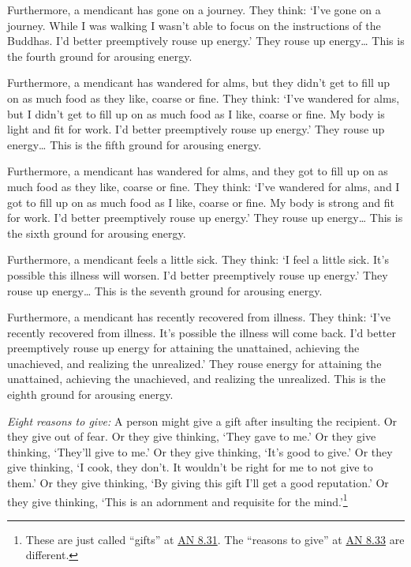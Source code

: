 \documentclass[12pt,openany]{book}%
\begin{document}
Furthermore, a mendicant has gone on a journey. They think: ‘I’ve gone on a journey. While I was walking I wasn’t able to focus on the instructions of the Buddhas. I’d better preemptively rouse up energy.’ They rouse up energy… This is the fourth ground for arousing energy. 

Furthermore, a mendicant has wandered for alms, but they didn’t get to fill up on as much food as they like, coarse or fine. They think: ‘I’ve wandered for alms, but I didn’t get to fill up on as much food as I like, coarse or fine. My body is light and fit for work. I’d better preemptively rouse up energy.’ They rouse up energy… This is the fifth ground for arousing energy. 

Furthermore, a mendicant has wandered for alms, and they got to fill up on as much food as they like, coarse or fine. They think: ‘I’ve wandered for alms, and I got to fill up on as much food as I like, coarse or fine. My body is strong and fit for work. I’d better preemptively rouse up energy.’ They rouse up energy… This is the sixth ground for arousing energy. 

Furthermore, a mendicant feels a little sick. They think: ‘I feel a little sick. It’s possible this illness will worsen. I’d better preemptively rouse up energy.’ They rouse up energy… This is the seventh ground for arousing energy. 

Furthermore, a mendicant has recently recovered from illness. They think: ‘I’ve recently recovered from illness. It’s possible the illness will come back. I’d better preemptively rouse up energy for attaining the unattained, achieving the unachieved, and realizing the unrealized.’ They rouse energy for attaining the unattained, achieving the unachieved, and realizing the unrealized. This is the eighth ground for arousing energy. 

\emph{Eight reasons to give:} A person might give a gift after insulting the recipient. Or they give out of fear. Or they give thinking, ‘They gave to me.’ Or they give thinking, ‘They’ll give to me.’ Or they give thinking, ‘It’s good to give.’ Or they give thinking, ‘I cook, they don’t. It wouldn’t be right for me to not give to them.’ Or they give thinking, ‘By giving this gift I’ll get a good reputation.’ Or they give thinking, ‘This is an adornment and requisite for the mind.’\footnote{These are just called “gifts” at \href{https://suttacentral.net/an8.31/en/sujato}{AN 8.31}. The “reasons to give” at \href{https://suttacentral.net/an8.33/en/sujato}{AN 8.33} are different. } 
\end{document}
